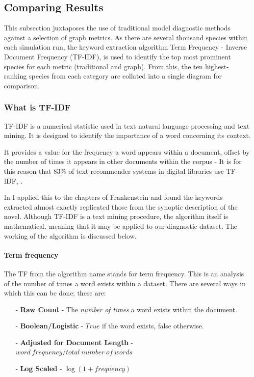 \subsection{Comparing Results}
This subsection juxtaposes the use of traditional model diagnostic methods against a selection of graph metrics. As there are several thousand species within each simulation run, the keyword extraction algorithm Term Frequency - Inverse Document Frequency (TF-IDF), is used to identify the top most prominent species for each metric (traditional and graph). From this, the ten highest-ranking species from each category are collated into a single diagram for comparison. 


\subsubsection{What is TF-IDF}
TF-IDF is a numerical statistic used in text natural language processing and text mining. It is designed to identify the importance of a word concerning its context. 

It provides a value for the frequency a word appears within a document, offset by the number of times it appears in other documents within the corpus - It is for this reason that 83\% of text recommender systems in digital libraries use TF-IDF, \citep{tf83}. 

 In \citep{frankenstein} I applied this to the chapters of Frankenstein and found the keywords extracted almost exactly replicated those from the synoptic description of the novel. Although TF-IDF is a text mining procedure, the algorithm itself is mathematical, meaning that it may be applied to our diagnostic dataset. The working of the algorithm is discussed below.

\paragraph*{Term frequency}
The TF from the algorithm name stands for term frequency. This is an analysis of the number of times a word exists within a dataset. There are several ways in which this can be done; these are:

\begin{itemize}
    \item[-] \textbf{Raw Count} - The \textit{number of times} a word exists within the document.
    \item[-] \textbf{Boolean/Logistic} - $True$ if the word exists, false otherwise.
    \item[-] \textbf{Adjusted for Document Length} -  $word\ frequency / total\ number\ of\ words$
    \item[-] \textbf{Log Scaled} - $\log(1+frequency)$
\end{itemize}

